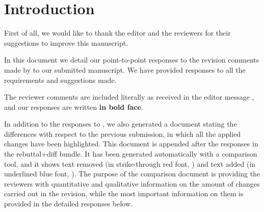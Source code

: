 \section{Introduction}
\label{sec:introduction}

First of all, we would like to thank the editor and the reviewers for their suggestions to improve this manuscript.

In this document we detail our point-to-point responses to the revision comments made by \ReplyAudience{} to our submitted manuscript. We have provided responses to all the requirements and suggestions made.

The reviewer comments are included literally as received in the editor message , and our responses are written \textbf{in bold face}.

In addition to the responses to \ReplyAudience{}, we also generated a document stating the differences with respect to the previous submission, in which all the applied changes have been highlighted.
This document is appended after the responses in the rebuttal+diff bundle.
It has been generated automatically with a comparison tool, and it shows text removed (in strike-through red font, ) and text added (in underlined blue font, ). The purpose of the comparison document is providing the reviewers with quantitative and qualitative information on the amount of changes carried out in the revision, while the most important information on them is provided in the detailed responses below.

